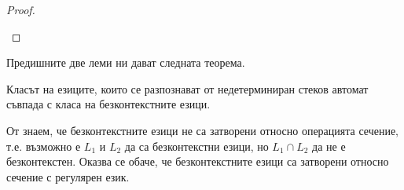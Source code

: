 \begin{proof}
\begin{description}
\begin{itemize}
    \end{itemize}
  \end{description}
\end{proof}

Предишните две леми ни дават следната теорема.
\begin{important}
  \begin{theorem}
    \label{th:push-down-context-free}
    Класът на езиците, които се разпознават от недетерминиран стеков автомат съвпада с
    класа на безконтекстните езици.
  \end{theorem}
\end{important}



От  знаем, че безконтекстните езици не
са затворени относно операцията сечение, т.е. възможно е $L_1$ и $L_2$ да са безконтекстни
езици, но $L_1 \cap L_2$ да не е безконтекстен.
Оказва се обаче, че безконтекстните езици са затворени относно сечение с регулярен език.

